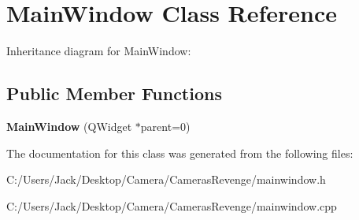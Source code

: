 \hypertarget{class_main_window}{\section{Main\+Window Class Reference}
\label{class_main_window}
}


Inheritance diagram for Main\+Window\+:
\subsection*{Public Member Functions}
\begin{DoxyCompactItemize}
\item 
\hypertarget{class_main_window_a8b244be8b7b7db1b08de2a2acb9409db}{{\bfseries Main\+Window} (Q\+Widget $\ast$parent=0)}\label{class_main_window_a8b244be8b7b7db1b08de2a2acb9409db}

\end{DoxyCompactItemize}


The documentation for this class was generated from the following files\+:\begin{DoxyCompactItemize}
\item 
C\+:/\+Users/\+Jack/\+Desktop/\+Camera/\+Cameras\+Revenge/mainwindow.\+h\item 
C\+:/\+Users/\+Jack/\+Desktop/\+Camera/\+Cameras\+Revenge/mainwindow.\+cpp\end{DoxyCompactItemize}
